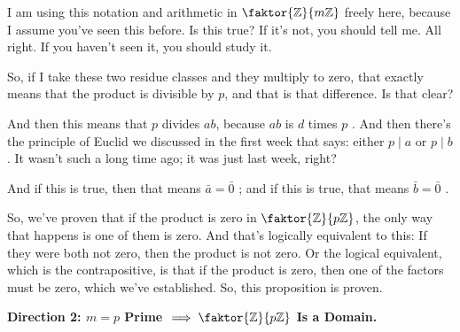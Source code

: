 \begin{proofWrapper}
\begin{speech}[00:19:24 - 00:21:50]
I am using this notation and arithmetic in $\faktor{\mathbb{Z}}{m\mathbb{Z}}$ freely here, because I assume you've seen this before. Is this true? If it's not, you should tell me. All right. If you haven't seen it, you should study it.

So, if I take these two residue classes and they multiply to zero, that exactly means that the product is divisible by $p$, and that is that difference. Is that clear?

And then this means that $p$ divides $ab$, because $ab$ is $d$ times $p$ . And then there's the principle of Euclid we discussed in the first week that says: either $p \mid a$ or $p \mid b$ . It wasn't such a long time ago; it was just last week, right?

And if this is true, then that means $\bar{a} = \bar{0}$ ; and if this is true, that means $\bar{b} = \bar{0}$ .

So, we've proven that if the product is zero in $\faktor{\mathbb{Z}}{p\mathbb{Z}}$, the only way that happens is one of them is zero. And that's logically equivalent to this: If they were both not zero, then the product is not zero. Or the logical equivalent, which is the contrapositive, is that if the product is zero, then one of the factors must be zero, which we've established. So, this proposition is proven.
\end{speech}

\begin{content}
\textbf{Direction 2: \texorpdfstring{$m = p$}{m=p} Prime \texorpdfstring{$\implies \faktor{\mathbb{Z}}{p\mathbb{Z}}$}{=> Z/pZ} Is a Domain.}


\end{content}
\end{proofWrapper}

